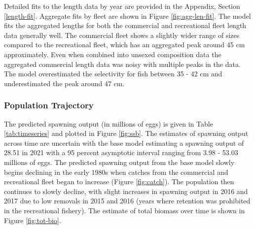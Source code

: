 \documentclass[11pt,
  english,
  a4paper,
]{article}
\begin{document}
\leavevmode\tagmcend\tagstructend\par


Detailed fits to the length data by year are provided in the Appendix, Section \ref{length-fit}. Aggregate fits by fleet are shown in Figure \ref{fig:agg-len-fit}. The model fits the aggregated lengths for both the commercial and recreational fleet length data generally well. The commercial fleet shows a slightly wider range of sizes compared to the recreational fleet, which has an aggregated peak around 45 cm approximately. Even when combined into unsexed composition data the aggregated commercial length data was noisy with multiple peaks in the data. The model overestimated the selectivity for fish between 35 - 42 cm and underestimated the peak around 47 cm.

\leavevmode\tagmcend\tagstructend\par


\hypertarget{population-trajectory}{%
\subsubsection{Population Trajectory}\label{population-trajectory}}

\leavevmode\tagmcend\tagstructend


The predicted spawning output (in millions of eggs) is given in Table \ref{tab:timeseries} and plotted in Figure \ref{fig:ssb}. The estimates of spawning output across time are uncertain with the base model estimating a spawning output of 28.51 in 2021 with a 95 percent asymptotic interval ranging from 3.98 - 53.03 millions of eggs. The predicted spawning output from the base model slowly begins declining in the early 1980s when catches from the commercial and recreational fleet began to increase (Figure \ref{fig:catch}). The population then continues to slowly decline, with slight increases in spawning output in 2016 and 2017 due to low removals in 2015 and 2016 (years where retention was prohibited in the recreational fishery). The estimate of total biomass over time is shown in Figure \ref{fig:tot-bio}.

\leavevmode\tagmcend\tagstructend\par

\end{document}
